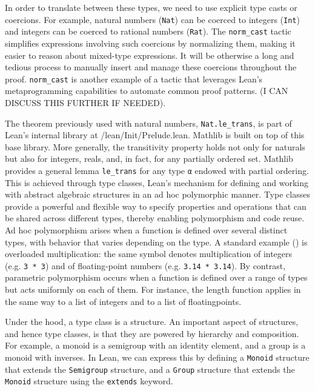In order to translate between these types, we need to use explicit type casts or coercions.
For example, natural numbers (\lstinline[language=lean]|Nat|) can be coerced to integers (\lstinline[language=lean]|Int|) and integers can be coerced
to rational numbers (\lstinline[language=lean]|Rat|).
The \lstinline[language=lean]|norm_cast| tactic simplifies expressions involving such coercions
by normalizing them, making it easier to reason about mixed-type expressions.
It  will be otherwise a long and tedious process to manually insert and manage 
these coercions throughout the proof.
\lstinline[language=lean]|norm_cast| is another example of a tactic that leverages 
Lean's metaprogramming capabilities to automate common proof patterns. 
(I CAN DISCUSS THIS FURTHER IF NEEDED).

The theorem previously used with natural numbers, \lstinline[language=lean]|Nat.le_trans|, 
is part of Lean’s internal library at /lean/Init/Prelude.lean. 
Mathlib is built on top of this base library.
More generally, the transitivity property holds not only for naturals but also for integers, 
reals, and, in fact, for any partially ordered set. 
Mathlib provides a general lemma \lstinline[language=lean]|le_trans| for any type 
\lstinline[language=lean]|α| endowed with partial ordering.
This is achieved through type classes, Lean’s mechanism for defining and working with 
abstract algebraic structures in an ad hoc polymorphic manner.
Type classes provide a powerful and flexible way to specify properties and 
operations that can be shared across different types, thereby enabling 
polymorphism and code reuse.
Ad hoc polymorphism arises when a function is defined over several distinct types, 
with behavior that varies depending on the type. A standard example (\cite{wadler_blott_ad_hoc_polymorphism_1988}) is overloaded 
multiplication: the same symbol denotes multiplication of integers 
(e.g. \lstinline[language=lean]|3 * 3|) and of floating-point numbers 
(e.g. \lstinline[language=lean]|3.14 * 3.14|).
By contrast, parametric polymorphism occurs when a function is defined over a 
range of types but acts uniformly on each of them. For instance, the length 
function applies in the same way to a list of integers and to a list of 
floatingpoints.

Under the hood, a type class is a structure. An important aspect of structures,
and hence type classes, is that they are powered by hierarchy and composition.
For example, a monoid is a semigroup with an identity element, and a group is a monoid with inverses. In Lean, we can express this
by defining a \lstinline[language=lean]|Monoid| structure that extends 
the \lstinline[language=lean]|Semigroup| structure, 
and a \lstinline[language=lean]|Group| structure 
that extends the \lstinline[language=lean]|Monoid| structure
using the \lstinline[language=lean]|extends| keyword.


